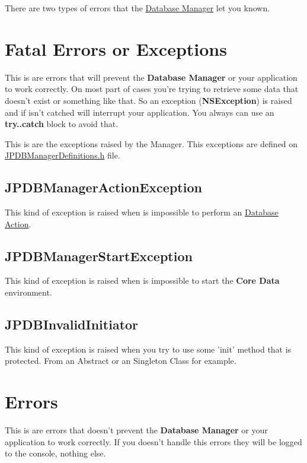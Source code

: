There are two types of errors that the \hyperlink{interface_j_p_d_b_manager}{Database Manager} let you known.\hypertarget{errors_fatal_errors}{}\section{Fatal Errors or Exceptions}\label{errors_fatal_errors}
This is are errors that will prevent the {\bfseries Database Manager} or your application to work correctly. On most part of cases you're trying to retrieve some data that doesn't exist or something like that. So an exception ({\bfseries NSException}) is raised and if isn't catched will interrupt your application. You always can use an {\bfseries try..catch} block to avoid that.

This is are the exceptions raised by the Manager. This exceptions are defined on \hyperlink{_j_p_d_b_manager_definitions_8h_source}{JPDBManagerDefinitions.h} file.\hypertarget{errors_JPDBManagerActionException}{}\subsection{JPDBManagerActionException}\label{errors_JPDBManagerActionException}
This kind of exception is raised when is impossible to perform an \hyperlink{interface_j_p_d_b_manager_action}{Database Action}.\hypertarget{errors_JPDBManagerStartException}{}\subsection{JPDBManagerStartException}\label{errors_JPDBManagerStartException}
This kind of exception is raised when is impossible to start the {\bfseries Core Data} environment.\hypertarget{errors_JPDBInvalidInitiator}{}\subsection{JPDBInvalidInitiator}\label{errors_JPDBInvalidInitiator}
This kind of exception is raised when you try to use some 'init' method that is protected. From an Abstract or an Singleton Class for example.\hypertarget{errors_errors_section}{}\section{Errors}\label{errors_errors_section}
This is are errors that doesn't prevent the {\bfseries Database Manager} or your application to work correctly. If you doesn't handle this errors they will be logged to the console, nothing else.

